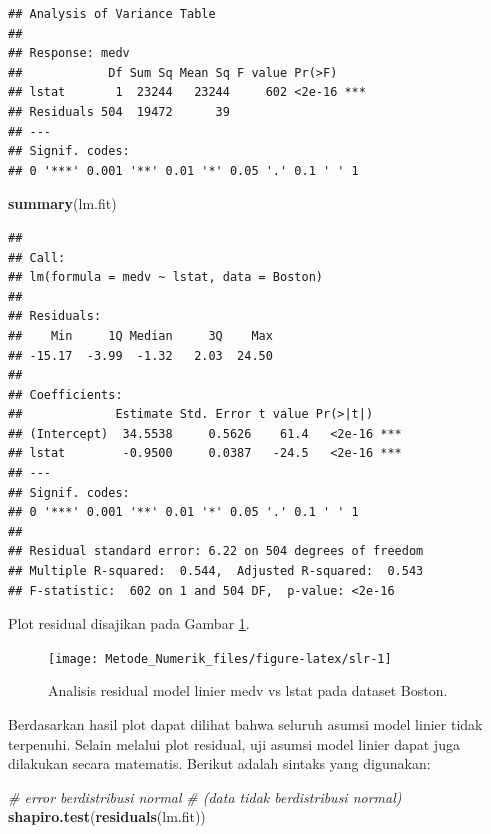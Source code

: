 \documentclass[]{book}
\newenvironment{Shaded}{\begin{snugshade}}{\end{snugshade}}
\newcommand{\CommentTok}[1]{\textcolor[rgb]{0.56,0.35,0.01}{\textit{#1}}}
\newcommand{\KeywordTok}[1]{\textcolor[rgb]{0.13,0.29,0.53}{\textbf{#1}}}
\newcommand{\NormalTok}[1]{#1}
\theoremstyle{definition}
\theoremstyle{definition}
\theoremstyle{definition}
\theoremstyle{remark}
\begin{document}
\begin{verbatim}
## Analysis of Variance Table
## 
## Response: medv
##            Df Sum Sq Mean Sq F value Pr(>F)    
## lstat       1  23244   23244     602 <2e-16 ***
## Residuals 504  19472      39                   
## ---
## Signif. codes:  
## 0 '***' 0.001 '**' 0.01 '*' 0.05 '.' 0.1 ' ' 1
\end{verbatim}

\begin{Shaded}
\begin{Highlighting}[]
\KeywordTok{summary}\NormalTok{(lm.fit)}
\end{Highlighting}
\end{Shaded}

\begin{verbatim}
## 
## Call:
## lm(formula = medv ~ lstat, data = Boston)
## 
## Residuals:
##    Min     1Q Median     3Q    Max 
## -15.17  -3.99  -1.32   2.03  24.50 
## 
## Coefficients:
##             Estimate Std. Error t value Pr(>|t|)    
## (Intercept)  34.5538     0.5626    61.4   <2e-16 ***
## lstat        -0.9500     0.0387   -24.5   <2e-16 ***
## ---
## Signif. codes:  
## 0 '***' 0.001 '**' 0.01 '*' 0.05 '.' 0.1 ' ' 1
## 
## Residual standard error: 6.22 on 504 degrees of freedom
## Multiple R-squared:  0.544,  Adjusted R-squared:  0.543 
## F-statistic:  602 on 1 and 504 DF,  p-value: <2e-16
\end{verbatim}

Plot residual disajikan pada Gambar \ref{fig:slr}.

\begin{figure}

{\centering \texttt{[image: Metode\_Numerik\_files/figure-latex/slr-1]} 

}

\caption{Analisis residual model linier medv vs lstat pada dataset Boston.}\label{fig:slr}
\end{figure}

Berdasarkan hasil plot dapat dilihat bahwa seluruh asumsi model linier tidak terpenuhi. Selain melalui plot residual, uji asumsi model linier dapat juga dilakukan secara matematis. Berikut adalah sintaks yang digunakan:

\begin{Shaded}
\begin{Highlighting}[]
\CommentTok{# error berdistribusi normal }
\CommentTok{# (data tidak berdistribusi normal)}
\KeywordTok{shapiro.test}\NormalTok{(}\KeywordTok{residuals}\NormalTok{(lm.fit))}
\end{Highlighting}
\end{Shaded}
\end{document}
